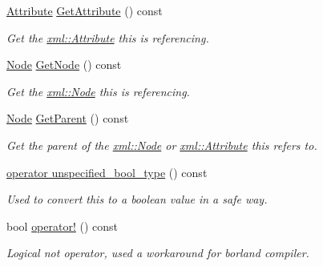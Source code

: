 \begin{DoxyCompactItemize}
\item 
\hypertarget{classphys_1_1xml_1_1XPathNode_a258785388868adf9fa53437cac7cd41c}{
\hyperlink{classphys_1_1xml_1_1Attribute}{Attribute} \hyperlink{classphys_1_1xml_1_1XPathNode_a258785388868adf9fa53437cac7cd41c}{GetAttribute} () const }
\label{classphys_1_1xml_1_1XPathNode_a258785388868adf9fa53437cac7cd41c}

\begin{DoxyCompactList}\small\item\em Get the \hyperlink{classphys_1_1xml_1_1Attribute}{xml::Attribute} this is referencing. \item\end{DoxyCompactList}\item 
\hyperlink{classphys_1_1xml_1_1Node}{Node} \hyperlink{classphys_1_1xml_1_1XPathNode_ad34ea7db6cabdfe92656b7d033dbbf35}{GetNode} () const 
\begin{DoxyCompactList}\small\item\em Get the \hyperlink{classphys_1_1xml_1_1Node}{xml::Node} this is referencing. \item\end{DoxyCompactList}\item 
\hyperlink{classphys_1_1xml_1_1Node}{Node} \hyperlink{classphys_1_1xml_1_1XPathNode_a10d6dce64d14cf3d39bb952efd4ca8aa}{GetParent} () const 
\begin{DoxyCompactList}\small\item\em Get the parent of the \hyperlink{classphys_1_1xml_1_1Node}{xml::Node} or \hyperlink{classphys_1_1xml_1_1Attribute}{xml::Attribute} this refers to. \item\end{DoxyCompactList}\item 
\hyperlink{classphys_1_1xml_1_1XPathNode_a7787db180e64bdc5f18772cc2ef5ce5c}{operator unspecified\_\-bool\_\-type} () const 
\begin{DoxyCompactList}\small\item\em Used to convert this to a boolean value in a safe way. \item\end{DoxyCompactList}\item 
bool \hyperlink{classphys_1_1xml_1_1XPathNode_a3c596b9cacb6265df6acffb91b9a7484}{operator!} () const 
\begin{DoxyCompactList}\small\item\em Logical not operator, used a workaround for borland compiler. \item\end{DoxyCompactList}\item 

\end{DoxyCompactItemize}
